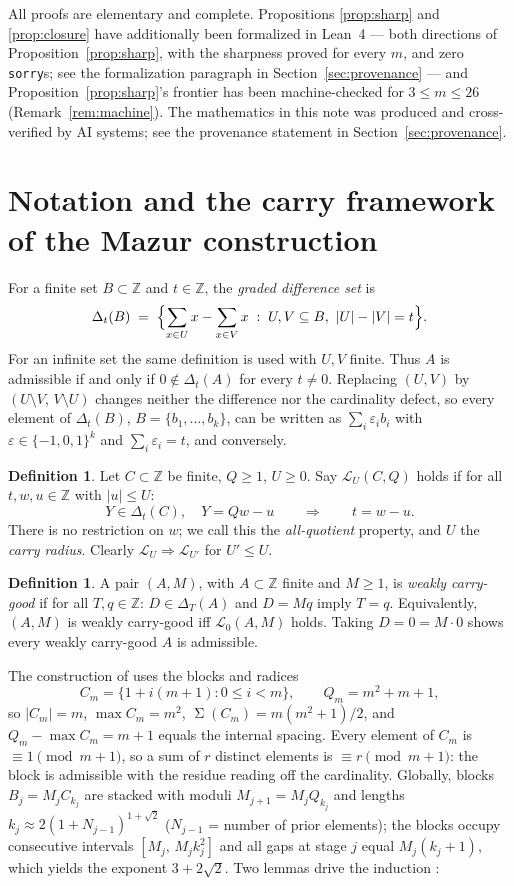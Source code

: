 \documentclass[11pt]{article}
\theoremstyle{definition}
\newtheorem{definition}[lemma]{Definition}
\theoremstyle{remark}
\newcommand{\Z}{\mathbb{Z}}
\newcommand{\loc}[1]{\mathcal{L}_{#1}}
\DeclareMathOperator{\SSum}{\Sigma}
\begin{document}
All proofs are elementary and complete. Propositions \ref{prop:sharp}
and \ref{prop:closure} have additionally been formalized in Lean~4 ---
both directions of Proposition~\ref{prop:sharp}, with the sharpness
proved for every $m$, and zero \texttt{sorry}s; see the formalization
paragraph in Section~\ref{sec:provenance} --- and
Proposition~\ref{prop:sharp}'s frontier has been machine-checked for
$3\le m\le26$ (Remark~\ref{rem:machine}). The mathematics in this note
was produced and cross-verified by AI systems; see the provenance
statement in Section~\ref{sec:provenance}.

\section{Notation and the carry framework of the Mazur
construction}\label{sec:notation}

For a finite set $B\subset\Z$ and $t\in\Z$, the \emph{graded difference
set} is
\[
\Delta_t(B)\;=\;\Bigl\{\sum_{x\in U}x-\sum_{x\in V}x \;:\;
U,V\subseteq B,\ |U|-|V|=t\Bigr\}.
\]
For an infinite set the same definition is used with $U,V$ finite. Thus
$A$ is admissible if and only if $0\notin\Delta_t(A)$ for every $t\ne0$.
Replacing $(U,V)$ by $(U\setminus V,\,V\setminus U)$ changes neither the
difference nor the cardinality defect, so every element of $\Delta_t(B)$,
$B=\{b_1,\dots,b_k\}$, can be written as $\sum_i\varepsilon_ib_i$ with
$\varepsilon\in\{-1,0,1\}^k$ and $\sum_i\varepsilon_i=t$, and conversely.

\begin{definition}\label{def:local}
Let $C\subset\Z$ be finite, $Q\ge1$, $U\ge0$. Say $\loc{U}(C,Q)$ holds if
for all $t,w,u\in\Z$ with $|u|\le U$:
\[
Y\in\Delta_t(C),\quad Y=Qw-u
\qquad\Longrightarrow\qquad t=w-u .
\]
There is no restriction on $w$; we call this the \emph{all-quotient}
property, and $U$ the \emph{carry radius}. Clearly
$\loc{U}\Rightarrow\loc{U'}$ for $U'\le U$.
\end{definition}

\begin{definition}\label{def:wcg}
A pair $(A,M)$, with $A\subset\Z$ finite and $M\ge1$, is \emph{weakly
carry-good} if for all $T,q\in\Z$: $D\in\Delta_T(A)$ and $D=Mq$ imply
$T=q$. Equivalently, $(A,M)$ is weakly carry-good iff $\loc{0}(A,M)$
holds. Taking $D=0=M\cdot0$ shows every weakly carry-good $A$ is
admissible.
\end{definition}

The construction of \cite{Mazur26} uses the blocks and radices
\[
C_m=\{1+i(m+1):0\le i<m\},\qquad Q_m=m^2+m+1 ,
\]
so $|C_m|=m$, $\max C_m=m^2$, $\SSum(C_m)=m(m^2+1)/2$, and
$Q_m-\max C_m=m+1$ equals the internal spacing. Every element of $C_m$ is
$\equiv1\pmod{m+1}$, so a sum of $r$ distinct elements is $\equiv
r\pmod{m+1}$: the block is admissible with the residue reading off the
cardinality. Globally, blocks $B_j=M_jC_{k_j}$ are stacked with moduli
$M_{j+1}=M_jQ_{k_j}$ and lengths $k_j\approx2(1+N_{j-1})^{1+\sqrt2}$
($N_{j-1}$ = number of prior elements); the blocks occupy consecutive
intervals $[M_j,\,M_jk_j^2]$ and all gaps at stage $j$ equal
$M_j(k_j+1)$, which yields the exponent $3+2\sqrt2$. Two lemmas drive the
induction \cite{Mazur26}:
\end{document}
